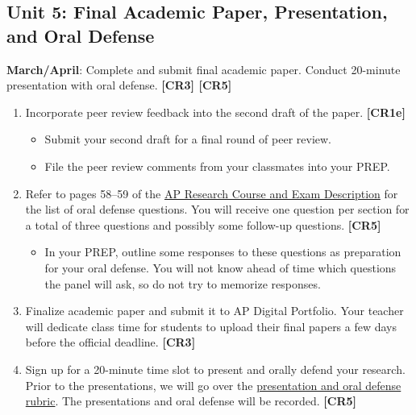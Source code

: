 \documentclass[11pt,]{article}
\providecommand{\tightlist}{%
  \setlength{\itemsep}{0pt}\setlength{\parskip}{0pt}}
\begin{document}
\hypertarget{unit-5-final-academic-paper-presentation-and-oral-defense}{%
\subsection{Unit 5: Final Academic Paper, Presentation, and Oral Defense}\label{unit-5-final-academic-paper-presentation-and-oral-defense}}

\textbf{March/April}: Complete and submit final academic paper. Conduct 20-minute presentation with oral defense. \textbf{{[}CR3{]} {[}CR5{]}}  

\begin{enumerate}
\def\labelenumi{\arabic{enumi}.}
\item
  Incorporate peer review feedback into the second draft of the paper. \textbf{{[}CR1e{]}} 

  \begin{itemize}
  \tightlist
  \item
    Submit your second draft for a final round of peer review.
  \item
    File the peer review comments from your classmates into your PREP.
  \end{itemize}
\item
  Refer to pages 58--59 of the \href{https://apcentral.collegeboard.org/pdf/ap-research-course-and-exam-description.pdf}{AP Research Course and Exam Description} for the list of oral defense questions. You will receive one question per section for a total of three questions and possibly some follow-up questions. \textbf{{[}CR5{]}} 

  \begin{itemize}
  \tightlist
  \item
    In your PREP, outline some responses to these questions as preparation for your oral defense. You will not know ahead of time which questions the panel will ask, so do not try to memorize responses.
  \end{itemize}
\item
  Finalize academic paper and submit it to AP Digital Portfolio. Your teacher will dedicate class time for students to upload their final papers a few days before the official deadline. \textbf{{[}CR3{]}} 
\item
  Sign up for a 20-minute time slot to present and orally defend your research. Prior to the presentations, we will go over the \href{https://secure-media.collegeboard.org/ap/pdf/ap17-sg-research-presentation.pdf}{presentation and oral defense rubric}. The presentations and oral defense will be recorded. \textbf{{[}CR5{]}} 
\end{enumerate}
\end{document}
